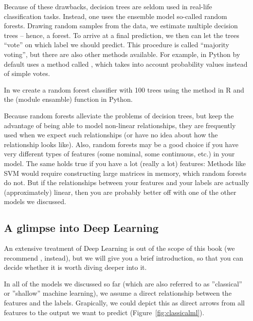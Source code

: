 Because of these drawbacks, decision trees are seldom used in
real-life classification tasks.  Instead, one uses the ensemble model so-called random forests.  Drawing random samples from the data, we estimate multiple
decision trees -- hence, a forest.  To arrive at a final prediction,
we then can let the trees ``vote'' on which label we should
predict. This procedure is called ``majority voting'', but there are
also other methods available. For example,  in Python  by default uses a method called , which takes into
account probability values instead of simple votes.

In  we create a random forest classifier with 100 trees using the  method  in R and the  (module ensamble) function  in Python.


Because random forests alleviate the problems of decision trees, but
keep the advantage of being able to model non-linear relationships,
they are frequently used when we expect such relationships (or have no
idea about how the relationship looks like).  Also, random forests may
be a good choice if you have very different types of features (some
nominal, some continuous, etc.) in your model. The same holds true if
you have a lot (really a lot) features: Methods like SVM would require
constructing large matrices in memory, which random forests do not.
But if the relationships between your features and your labels are
actually (approximately) linear, then you are probably better off with
one of the other models we discussed.


\subsection{A glimpse into Deep Learning} 

An extensive treatment of Deep Learning is out of the scope of this
book (we recommend \cite{geron2019hands}, instead), but we will give you a brief introduction, so that you can decide whether it is worth diving deeper
into it.

In all of the models we discussed so far (which are also referred to
as ''classical'' or ''shallow'' machine learning), we assume a direct relationship between the features and the labels. Grapically, we could depict this as direct arrows from all features to the output we want to predict
(Figure~\ref{fig:classicalml}).

